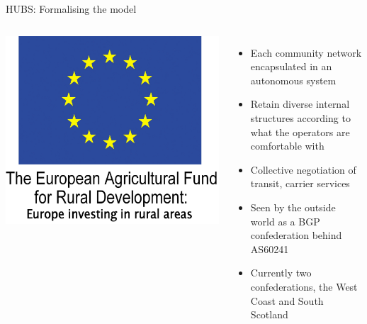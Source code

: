 \documentclass{beamer}
\begin{document}
\begin{frame}{HUBS: Formalising the model}
\begin{columns}
\begin{center}
      \hspace{1pt}
      \includegraphics[height=0.07\textheight]{eu-and-words.jpg}\\
    \end{center}
    \begin{itemize}
      \item Each community network encapsulated in an autonomous
        system
      \item Retain diverse internal structures according to what the
        operators are comfortable with
      \item Collective negotiation of transit, carrier services
      \item Seen by the outside world as a BGP confederation behind
        AS60241
      \item Currently two confederations, the West Coast and
        South Scotland
    \end{itemize}
  \end{columns}
\end{frame}
\end{document}
